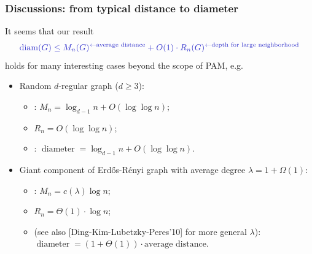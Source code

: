 \documentclass{beamer}
\theoremstyle{plain}
\theoremstyle{definition}
\begin{document}
\begin{frame}
\frametitle{Discussions: from typical distance to diameter}
It seems that our result 
\[
{\color{bgr} \operatorname{diam}(G) \leq M_n(G)^{\leftarrow\text{average distance}}  +O(1)\cdot R_n(G)^{ \leftarrow \text{depth for large neighborhood} }  }
\]
holds for many interesting cases beyond the scope of PAM, e.g.
\begin{itemize}
    \item\pause Random $d$-regular graph ($d \geq 3$): 
    \begin{itemize}
        \item\pause {\color{rgr}[Chung-Lu'02]}: $M_n=\log_{d-1} n+O(\log\log n)$;
        \item\pause $R_n=O(\log\log n)$;
        \item{}: $\operatorname{diameter}=\log_{d-1} n+O(\log\log n)$.
    \end{itemize}
    \item\pause Giant component of Erd\H{o}s-R\'{e}nyi graph with average degree $\lambda=1+\Omega(1)$:
    \begin{itemize}
        \item{}: $M_n=c(\lambda)\log n$;
        \item\pause $R_n=\Theta(1)\cdot\log n$;
        \item{} (see also {\color{rgr}[Ding-Kim-Lubetzky-Peres'10]} for more general $\lambda$): $\operatorname{diameter}=(1+\Theta(1))\cdot \text{average distance}$.
    \end{itemize}
\end{itemize}
\end{frame}
\end{document}
